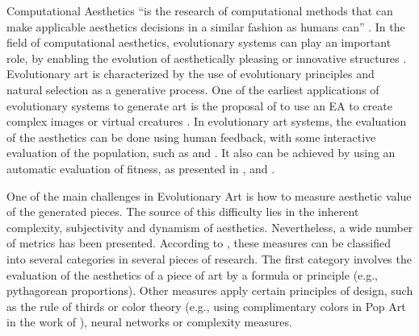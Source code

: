 Computational Aesthetics ``is the research of computational
methods that can make applicable aesthetics decisions in a similar
fashion as humans can'' \cite{COMPAESTH}. In the field of
computational aesthetics, evolutionary systems can play an important
role, by enabling the evolution of aesthetically pleasing or
innovative structures \cite{dipaola2009incorporating}. Evolutionary %
art is characterized by the use of evolutionary principles and natural
selection as a generative process. One of the earliest applications of
evolutionary systems to generate art is the proposal of 
to use an EA to create complex images \cite{sims1991artificial} or
virtual creatures  \cite{sims1994evolving}. In evolutionary art
systems, the evaluation of the aesthetics can be done using human
feedback, with some interactive evaluation of the population, such as
\cite{ashlock2006evolutionary,draves2006electric,moroni2000vox} and
\cite{sims1991artificial}. It also can be achieved by using an
automatic evaluation of fitness, as presented in
\cite{aguilar2008robotic,den2010comparing,dipaola2009incorporating,li2012investigating},
and \cite{sims1994evolving}. %

One of the main challenges in Evolutionary Art is how to measure
aesthetic value of the generated pieces. The source of this difficulty
lies in the inherent complexity, subjectivity and dynamism of
aesthetics. Nevertheless, a wide number of metrics has been
presented. According to 
\cite{galanter2012computational}, these measures can be classified
into several categories in several pieces of research. The first
category involves the evaluation of the aesthetics of a piece of art
by a formula or principle (e.g., pythagorean proportions). Other
measures apply certain principles of design, such as the rule of
thirds or color theory (e.g., using complimentary colors in Pop Art in
the work of  \cite{den2012evolving}),
neural networks or complexity measures.   %

